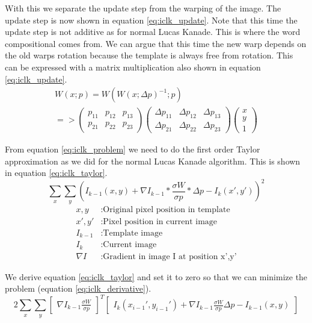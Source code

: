 \documentclass[11pt,a4paper,titlepage,oneside]{report}
\begin{document}
With this we separate the update step from the warping of the image. The update step is now shown in equation \ref{eq:iclk_update}. Note that this time the update step is not additive as for normal Lucas Kanade. This is where the word compositional comes from. We can argue that this time the new warp depends on the old warps rotation because the template is always free from rotation. This can be expressed with a matrix multiplication also shown in equation \ref{eq:iclk_update}.
\begin{equation}\label{eq:iclk_update}
  \begin{gathered}
    W(x;p)=W(W(x;\Delta p)^{-1}; p)\\
    =>
    \begin{pmatrix}
    p_{11} & p_{12} & p_{13} \\
    p_{21} & p_{22} & p_{23}
    \end{pmatrix}
    \begin{pmatrix}
      \Delta p_{11} & \Delta p_{12} & \Delta p_{13} \\
      \Delta p_{21} & \Delta p_{22} & \Delta p_{23}
    \end{pmatrix}
    \begin{pmatrix}
      x\\
      y\\
      1
    \end{pmatrix}
  \end{gathered}
\end{equation}

From equation \ref{eq:iclk_problem} we need to do the first order Taylor approximation as we did for the normal Lucas Kanade algorithm. This is shown in equation \ref{eq:iclk_taylor}.
\begin{equation}\label{eq:iclk_taylor}
  \sum_x\sum_y(I_{k-1}(x,y)+\nabla I_{k-1}*\frac{\sigma W}{\sigma p}*\Delta p-I_{k}(x',y'))^2
\end{equation}
\begin{align*}
  x,y        &:  \text{Original pixel position in template}\\
  x',y'      &:  \text{Pixel position in current image}\\
  I_{k-1}    &:  \text{Template image}\\
  I_{k}      &:  \text{Current image}\\
  \nabla I  &:  \text{Gradient in image I at position x',y'}
\end{align*}

We derive equation \ref{eq:iclk_taylor} and set it to zero so that we can minimize the problem (equation \ref{eq:iclk_derivative}).
\begin{equation}\label{eq:iclk_derivative}
  2\sum_x\sum_y\begin{bmatrix}\nabla I_{k-1}\frac{\sigma W}{\sigma p}\end{bmatrix}^T\begin{bmatrix}I_{k}(x_{i-1}',y_{i-1}')+\nabla I_{k-1}\frac{\sigma W}{\sigma p}\Delta p-I_{k-1}(x,y)\end{bmatrix}
\end{equation}
\end{document}
